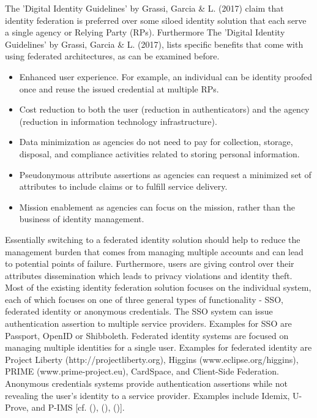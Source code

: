 {{	
	The 'Digital Identity Guidelines' by Grassi, Garcia \& L. (2017) claim that identity federation is preferred over some siloed identity solution that each serve a single agency or Relying Party (RPs). Furthermore The 'Digital Identity Guidelines' by Grassi, Garcia \& L. (2017), lists specific benefits that come with using federated architectures, as can be examined before. 
	
	\begin{itemize}
		\item Enhanced user experience. For example, an individual can be identity proofed once and reuse the issued credential at multiple RPs. 
		\item Cost reduction to both the user (reduction in authenticators) and the agency (reduction in information technology infrastructure). 
		\item Data minimization as agencies do not need to pay for collection, storage, disposal, and compliance activities related to storing personal information. 
		\item Pseudonymous attribute assertions as agencies can request a minimized set of attributes to include claims or to fulfill service delivery. 
		\item Mission enablement as agencies can focus on the mission, rather than the business of identity management.
	\end{itemize}
	
	Essentially switching to a federated identity solution should help to reduce the management burden that comes from managing multiple accounts and can lead to potential points of failure.  Furthermore, users are giving control over their attributes dissemination which leads to privacy violations and identity theft. Most of the existing identity federation solution focuses on the individual system, each of which focuses on one of three general types of functionality - SSO, federated identity or anonymous credentials. The SSO system can issue authentication assertion to multiple service providers. Examples for SSO are Passport, OpenID or Shibboleth. Federated identity systems are focused on managing multiple identities for a single user. Examples for federated identity are Project Liberty (http://projectliberty.org), Higgins (www.eclipse.org/higgins), PRIME (www.prime-project.eu), CardSpace, and
	Client-Side Federation. Anonymous credentials systems provide authentication assertions while not revealing the user's identity to a service provider. Examples include Idemix, U-Prove, and P-IMS [cf. (\cite{Birell:2013:FIMS}), (\cite{Boyed:2012:GSOA}), (\cite{NIST:2017:DIG})].
		
}}
